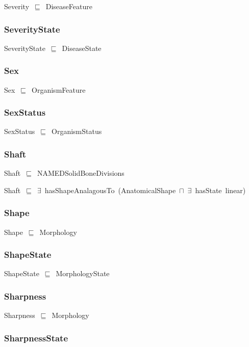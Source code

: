 \documentclass{article}
\begin{document}
Severity~\ensuremath{\sqsubseteq}~DiseaseFeature~

\subsubsection*{SeverityState}

SeverityState~\ensuremath{\sqsubseteq}~DiseaseState~

\subsubsection*{Sex}

Sex~\ensuremath{\sqsubseteq}~OrganismFeature~

\subsubsection*{SexStatus}

SexStatus~\ensuremath{\sqsubseteq}~OrganismStatus~

\subsubsection*{Shaft}

Shaft~\ensuremath{\sqsubseteq}~NAMEDSolidBoneDivisions~

Shaft~\ensuremath{\sqsubseteq}~\ensuremath{\exists}~hasShapeAnalagousTo~(AnatomicalShape~\ensuremath{\sqcap}~\ensuremath{\exists}~hasState~linear)~

\subsubsection*{Shape}

Shape~\ensuremath{\sqsubseteq}~Morphology~

\subsubsection*{ShapeState}

ShapeState~\ensuremath{\sqsubseteq}~MorphologyState~

\subsubsection*{Sharpness}

Sharpness~\ensuremath{\sqsubseteq}~Morphology~

\subsubsection*{SharpnessState}
\end{document}
